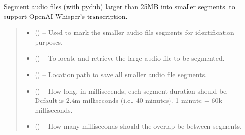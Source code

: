 \documentclass[letterpaper,10pt,english]{sphinxhowto}
\begin{document}
\begin{fulllineitems}
\label{\detokenize{_autosummary/custom_packages.preprocessing_modules.transcriber.subset_audio_with_overlap:custom_packages.preprocessing_modules.transcriber.subset_audio_with_overlap}}
\pysigstartsignatures
\pysiglinewithargsret
{}
{\sphinxparamcomma {}\sphinxparamcomma {}\sphinxparamcomma {}\sphinxparamcomma {}}
{}
\pysigstopsignatures
\sphinxAtStartPar
Segment audio files (with pydub) larger than 25MB into smaller segments, to support OpenAI Whisper’s transcription.
\begin{quote}\begin{description}
\begin{itemize}
\item {} 
\sphinxAtStartPar
{} () – Used to mark the smaller audio file segments for identification purposes.

\item {} 
\sphinxAtStartPar
{} () – To locate and retrieve the large audio file to be segmented.

\item {} 
\sphinxAtStartPar
{} () – Location path to save all smaller audio file segments.

\item {} 
\sphinxAtStartPar
{} (\sphinxstyleliteralemphasis{\sphinxupquote{ (}}\sphinxstyleliteralemphasis{\sphinxupquote{)}}) – How long, in milliseconds, each segment duration should be.
Default is 2.4m milliseconds (i.e., 40 minutes).
1 minute = 60k milliseconds.

\item {} 
\sphinxAtStartPar
{} () – How many milliseconds should the overlap be between segments.


\end{itemize}
\end{description}
\end{quote}
\end{fulllineitems}
\end{document}
